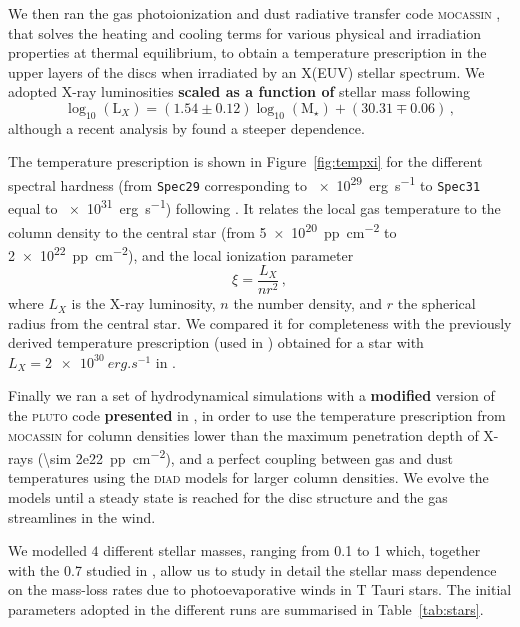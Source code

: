 \documentclass[usenatbib,useAMS,usedcolumn]{mnras}
\begin{document}
We then ran the gas photoionization and dust radiative transfer code \textsc{mocassin} , that solves the heating and cooling terms for various physical and irradiation properties at thermal equilibrium, to obtain a temperature prescription in the upper layers of the discs when irradiated by an X(EUV) stellar spectrum.
We adopted X-ray luminosities \textbf{scaled as a function of} stellar mass following 
\begin{equation}\label{eq:Lx}
	\log_{10}{(\mathrm{L}_X)} = (1.54 \pm 0.12) \log_{10}{(\mathrm{M}_\star)} + (30.31 \mp 0.06)\,,
\end{equation}
although a recent analysis by  found a steeper dependence.

The temperature prescription is shown in Figure~\ref{fig:tempxi} for the different spectral hardness (from \texttt{Spec29} corresponding to \SI{e29}{erg.s^{-1}} to \texttt{Spec31} equal to \SI{e31}{erg.s^{-1}}) following .
It relates the local gas temperature to the column density to the central star (from \SI{5e20}{pp.cm^{-2}} to \SI{2e22}{pp.cm^{-2}}), and the local ionization parameter 
\begin{equation}
    \xi = \frac{L_X}{n r^2}\,,
\end{equation}
where $L_X$ is the X-ray luminosity, $n$ the number density, and $r$ the spherical radius from the central star. We compared it for completeness with the previously derived temperature prescription (used in ) obtained for a star with $L_X=\SI{2e30}{erg.s^{-1}}$ in .

Finally we ran a set of hydrodynamical simulations with a \textbf{modified} version of the \textsc{pluto} code  \textbf{presented} in , in order to use the temperature prescription from \textsc{mocassin} for column densities lower than the maximum penetration depth of X-rays (\SI{\sim 2e22}{pp.cm^{-2}}), and a perfect coupling between gas and dust temperatures using the \textsc{diad} models for larger column densities.
We evolve the models until a steady state is reached for the disc structure and the gas streamlines in the wind.

We modelled $4$ different stellar masses, ranging from \SI{0.1}{\solarmass} to \SI{1}{\solarmass} which, together with the \SI{0.7}{\solarmass} studied in , allow us to study in detail the stellar mass dependence on the mass-loss rates due to photoevaporative winds in T Tauri stars. The initial parameters adopted in the different runs are summarised in Table~\ref{tab:stars}.
\end{document}

